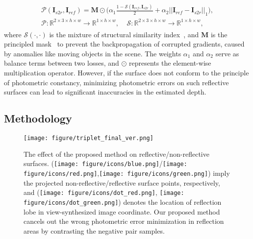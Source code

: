\begin{align}
\begin{split}
    \label{eq:photometric_error}
    \mathcal{P}(\mathbf{I}_{s2r}, \mathbf{I}_{ref}) = \mathbf{M} \odot \bigg(\alpha_{1}\frac{1 - \mathcal{S}(\mathbf{I}_{ref}, \mathbf{I}_{s2r})}{2} + \alpha_{2}||\mathbf{I}_{ref} - \mathbf{I}_{s2r}||_{1}\bigg),\\
    \mathcal{P}:\mathbb{R}^{2 \times 3 \times h \times w} \rightarrow \mathbb{R}^{1 \times h \times w},~~~~~\mathcal{S}:\mathbb{R}^{2 \times 3 \times h \times w} \rightarrow \mathbb{R}^{1 \times h \times w},
\end{split}
\end{align}
where $\mathcal{S}(\cdot, \cdot)$ is the mixture of structural similarity index~\citep{wang2004image}, and $\mathbf{M}$ is the principled mask~\citep{godard2019digging} to prevent the backpropagation of corrupted gradients, caused by anomalies like moving objects in the scene.
The weights $\alpha_1$ and $\alpha_2$ serve as balance terms between two losses, and $\odot$ represents the element-wise multiplication operator.
However, if the surface does not conform to the principle of photometric constancy, minimizing photometric errors on such reflective surfaces can lead to significant inaccuracies in the estimated depth.

\subsection{Methodology}
\label{sec:methodology}

\begin{figure}[t]
\begin{center}
  \texttt{[image: figure/triplet\_final\_ver.png]}
\end{center}
\caption{The effect of the proposed method on reflective/non-reflective surfaces. (\texttt{[image: figure/icons/blue.png]}/\texttt{[image: figure/icons/red.png]},\texttt{[image: figure/icons/green.png]}) imply the projected non-reflective/reflective surface points, respectively, and (\texttt{[image: figure/icons/dot\_red.png]}, \texttt{[image: figure/icons/dot\_green.png]}) denotes the location of reflection lobe in view-synthesized image coordinate. Our proposed method cancels out the wrong photometric error minimization in reflection areas by contrasting the negative pair samples.}
\label{fig:triplet}
\end{figure}

